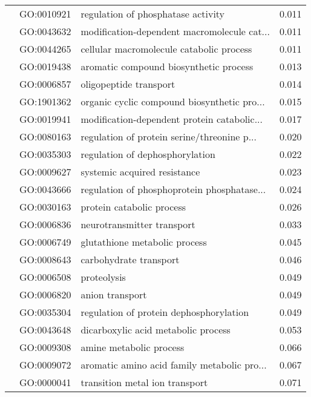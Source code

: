 \begin{longtable}{lllr}
   & GO:0010921 &           regulation of phosphatase activity &         0.011 \\
   & GO:0043632 &  modification-dependent macromolecule cat... &         0.011 \\
   & GO:0044265 &     cellular macromolecule catabolic process &         0.011 \\
   & GO:0019438 &       aromatic compound biosynthetic process &         0.013 \\
   & GO:0006857 &                       oligopeptide transport &         0.014 \\
   & GO:1901362 &  organic cyclic compound biosynthetic pro... &         0.015 \\
   & GO:0019941 &  modification-dependent protein catabolic... &         0.017 \\
   & GO:0080163 &  regulation of protein serine/threonine p... &         0.020 \\
   & GO:0035303 &              regulation of dephosphorylation &         0.022 \\
   & GO:0009627 &                 systemic acquired resistance &         0.023 \\
   & GO:0043666 &  regulation of phosphoprotein phosphatase... &         0.024 \\
   & GO:0030163 &                    protein catabolic process &         0.026 \\
   & GO:0006836 &                   neurotransmitter transport &         0.033 \\
   & GO:0006749 &                glutathione metabolic process &         0.045 \\
   & GO:0008643 &                       carbohydrate transport &         0.046 \\
   & GO:0006508 &                                  proteolysis &         0.049 \\
   & GO:0006820 &                              anion transport &         0.049 \\
   & GO:0035304 &      regulation of protein dephosphorylation &         0.049 \\
   & GO:0043648 &          dicarboxylic acid metabolic process &         0.053 \\
   & GO:0009308 &                      amine metabolic process &         0.066 \\
   & GO:0009072 &  aromatic amino acid family metabolic pro... &         0.067 \\
   & GO:0000041 &               transition metal ion transport &         0.071 \\

\end{longtable}
